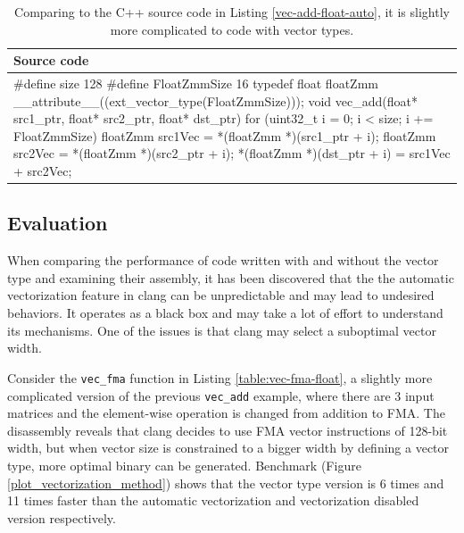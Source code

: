 \documentclass[logo,bsc,singlespacing,parskip]{infthesis}
\newenvironment{VerbatimCompact}
  {\vspace*{-2.5mm}\VerbatimEnvironment
   \par\Verbatim}
  {\endVerbatim\vspace*{-2.4mm}}
\begin{document}
\begin{table}[ht]\captionsetup{name=Listing}
\begin{tabular}{>{\raggedright\arraybackslash}p{14cm}}
    Source code\\
    \midrule
    \begin{VerbatimCompact}
#define size 128
#define FloatZmmSize 16
typedef float floatZmm __attribute__((ext_vector_type(FloatZmmSize)));
void vec_add(float* src1_ptr, float* src2_ptr, float* dst_ptr) {
    for (uint32_t i = 0; i < size; i += FloatZmmSize){
        floatZmm src1Vec = *(floatZmm *)(src1_ptr + i);
        floatZmm src2Vec = *(floatZmm *)(src2_ptr + i);
        *(floatZmm *)(dst_ptr + i) = src1Vec + src2Vec;
    }
}
\end{VerbatimCompact}
\end{tabular}
\caption{Comparing to the C++ source code in Listing \ref{vec-add-float-auto},
it is slightly more complicated to code with vector types.}
\label{vec-add-float-vecty}
\end{table}
\subsection{Evaluation}

\label{sec:vectorization-method-eval}
When comparing the performance of code written with and without the vector type
and examining their assembly, it has been discovered that the the automatic
vectorization feature in clang can be unpredictable and may lead to undesired
behaviors. It operates as a black box and may take a lot of effort to understand
its mechanisms. One of the issues is that clang may select a suboptimal vector
width.

Consider the \texttt{vec\_fma} function in Listing \ref{table:vec-fma-float}, a
slightly more complicated version of the previous \texttt{vec\_add} example,
where there are 3 input matrices and the element-wise operation is changed from
addition to FMA. The disassembly reveals that clang decides to use FMA vector
instructions of 128-bit width, but when vector size is constrained to a bigger
width by defining a vector type, more optimal binary can be generated. Benchmark
(Figure \ref{plot_vectorization_method}) shows that the vector type version is 6
times and 11 times faster than the automatic vectorization and vectorization
disabled version respectively.
\end{document}
